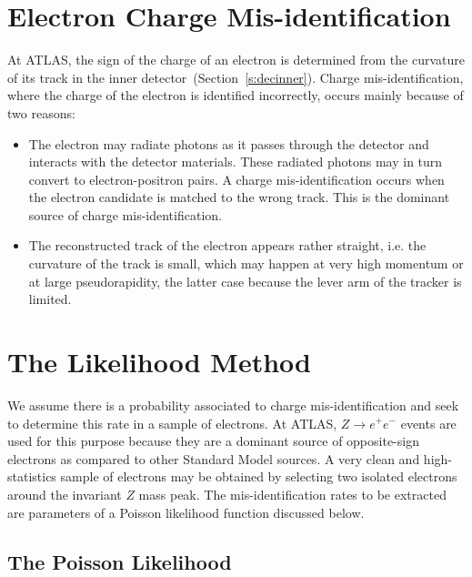 \section{Electron Charge Mis-identification}\label{s:chargereasons}

At ATLAS, the sign of the charge of an electron is determined from the
curvature of its track in the inner detector~(Section~\ref{s:decinner}). Charge
mis-identification, where the charge of the electron is identified incorrectly,
occurs mainly because of two reasons:

\begin{itemize}

	\item The electron may radiate photons as it passes through the detector and
	      interacts with the detector materials. These radiated photons may in turn
	      convert to electron-positron pairs. A charge mis-identification occurs when the
				electron candidate is matched to the wrong track. This is the dominant source 
				of charge mis-identification. 

	\item The reconstructed track of the electron appears rather straight, i.e. the
	      curvature of the track is small, which may happen at very high momentum or at
	      large pseudorapidity, the latter case because the lever arm of the tracker is
	      limited.

\end{itemize}

\section{The Likelihood Method}\label{s:cllhmethod}

We assume there is a probability associated to charge mis-identification and
seek to determine this rate in a sample of electrons. At ATLAS, $Z\to e^+e^-$
events are used for this purpose because they are a dominant source of
opposite-sign electrons as compared to other Standard Model sources. A very
clean and high-statistics sample of electrons may be obtained by selecting two
isolated electrons around the invariant $Z$ mass peak. The mis-identification
rates to be extracted are parameters of a Poisson likelihood function discussed
below.

\subsection{The Poisson Likelihood}\label{s:cpllh}

